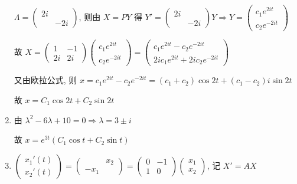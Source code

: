 \begin{enumerate}
			       \( \Lambda = \begin{pmatrix}
				       2i &     \\
				          & -2i
			       \end{pmatrix} \), 则由 \( X = P Y \) 得 \( Y' = \begin{pmatrix}
				       2i &     \\
				          & -2i
			       \end{pmatrix} Y \Rightarrow Y = \begin{pmatrix}
				       c_{1}e^{2it} \\
				       c_{2}e^{-2it}
			       \end{pmatrix} \)

			       故 \( X = \begin{pmatrix}
				       1  & -1 \\
				       2i & 2i
			       \end{pmatrix}\begin{pmatrix}
				       c_{1}e^{2it} \\
				       c_{2}e^{-2it}
			       \end{pmatrix} = \begin{pmatrix}
				       c_{1}e^{2it} - c_{2}e^{-2it} \\
				       2ic_{1}e^{2it} + 2ic_{2}e^{-2it}
			       \end{pmatrix} \)

			       又由欧拉公式, 则 \( x = c_{1}e^{2it} - c_{2}e^{-2it} = (c_{1}+c_{2})\cos 2t + (c_{1}-c_{2})i\sin 2t \)

			       故 \( x = C_{1}\cos 2t + C_{2}\sin 2t \)
			 \item %
			       由 \( \lambda^{2} - 6\lambda + 10 = 0 \Rightarrow \lambda = 3 \pm i \)

			       故 \( x = e^{3t}(C_{1}\cos t + C_{2}\sin t) \)
			 \item %
			       \( \begin{pmatrix}
				       x_{1}'(t) \\
				       x_{2}'(t)
			       \end{pmatrix} = \begin{pmatrix}
				              & x_{2} \\
				       -x_{1} &
			       \end{pmatrix} = \begin{pmatrix}
				       0 & -1 \\
				       1 & 0
			       \end{pmatrix}\begin{pmatrix}
				       x_{1} \\
				       x_{2}
			       \end{pmatrix} \), 记 \( X' = AX \)


\end{enumerate}
